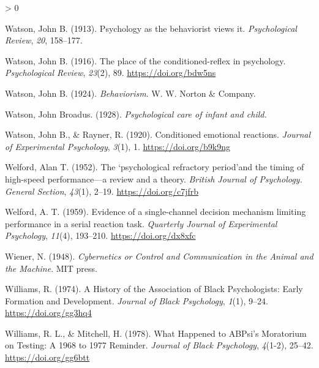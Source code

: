 \documentclass[
  oneside,
  12pt]{crumpbook}
\newlength{\cslhangindent}
\newenvironment{CSLReferences}[2] %
 {%
  \setlength{\parindent}{0pt}
  \ifodd #1 \everypar{\setlength{\hangindent}{\cslhangindent}}\ignorespaces\fi
  \ifnum #2 > 0
  \setlength{\parskip}{#2\baselineskip}
  \fi
 }%
 {}
\begin{document}
\begin{CSLReferences}{1}{0}
\leavevmode\hypertarget{ref-watsonPsychologyBehavioristViews1913}{}%
Watson, John B. (1913). Psychology as the behaviorist views it. \emph{Psychological Review}, \emph{20}, 158--177.

\leavevmode\hypertarget{ref-watsonPlaceConditionedreflexPsychology1916}{}%
Watson, John B. (1916). The place of the conditioned-reflex in psychology. \emph{Psychological Review}, \emph{23}(2), 89. \url{https://doi.org/bdw5ns}

\leavevmode\hypertarget{ref-watsonBehaviorism1924}{}%
Watson, John B. (1924). \emph{Behaviorism}. {W. W. Norton \& Company}.

\leavevmode\hypertarget{ref-watsonPsychologicalCareInfant1928}{}%
Watson, John Broadus. (1928). \emph{Psychological care of infant and child.}

\leavevmode\hypertarget{ref-watsonConditionedEmotionalReactions1920}{}%
Watson, John B., \& Rayner, R. (1920). Conditioned emotional reactions. \emph{Journal of Experimental Psychology}, \emph{3}(1), 1. \url{https://doi.org/b9k9ng}

\leavevmode\hypertarget{ref-welfordPsychologicalRefractoryPeriod1952}{}%
Welford, Alan T. (1952). The `psychological refractory period'and the timing of high-speed performance---a review and a theory. \emph{British Journal of Psychology. General Section}, \emph{43}(1), 2--19. \url{https://doi.org/c7jfrb}

\leavevmode\hypertarget{ref-welfordEvidenceSinglechannelDecision1959}{}%
Welford, A. T. (1959). Evidence of a single-channel decision mechanism limiting performance in a serial reaction task. \emph{Quarterly Journal of Experimental Psychology}, \emph{11}(4), 193--210. \url{https://doi.org/dx8xfc}

\leavevmode\hypertarget{ref-wienerCyberneticsControlCommunication1948}{}%
Wiener, N. (1948). \emph{Cybernetics or {Control} and {Communication} in the {Animal} and the {Machine}}. {MIT press}.

\leavevmode\hypertarget{ref-williamsHistoryAssociationBlack1974}{}%
Williams, R. (1974). A {History} of the {Association} of {Black Psychologists}: {Early Formation} and {Development}. \emph{Journal of Black Psychology}, \emph{1}(1), 9--24. \url{https://doi.org/gg3hq4}

\leavevmode\hypertarget{ref-williamsWhatHappenedABPsi1978}{}%
Williams, R. L., \& Mitchell, H. (1978). What {Happened} to {ABPsi}'s {Moratorium} on {Testing}: {A} 1968 to 1977 {Reminder}. \emph{Journal of Black Psychology}, \emph{4}(1-2), 25--42. \url{https://doi.org/gg6btt}


\end{CSLReferences}
\end{document}
